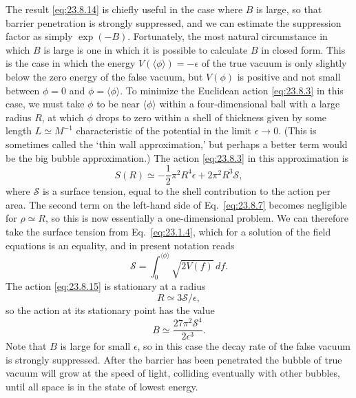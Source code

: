 The result \eqref{eq:23.8.14} is chiefly useful in the case where $B$ is large, so that barrier penetration is strongly suppressed, and we can estimate the suppression factor as simply $\exp(-B)$. Fortunately, the most natural circumstance in which $B$ is large is one in which it is possible to calculate $B$ in closed form. This is the case in which the energy $V(\langle\phi\rangle)=-\epsilon$ of the true vacuum is only slightly below the zero energy of the false vacuum, but $V(\phi)$ is positive and not small between $\phi=0$ and $\phi=\langle\phi\rangle$. To minimize the Euclidean action \eqref{eq:23.8.3} in this case, we must take $\phi$ to be near $\langle\phi\rangle$ within a four-dimensional ball with a large radius $R$, at which $\phi$ drops to zero within a shell of thickness given by some length $L\simeq M^{-1}$ characteristic of the potential in the limit $\epsilon\to0$. (This is sometimes called the `thin wall approximation,' but perhaps a better term would be the big bubble approximation.) The action \eqref{eq:23.8.3} in this approximation is
\begin{equation}
 S(R)\simeq-\frac{1}{2}\pi^2R^4\epsilon+2\pi^2R^3\mathcal S,
 \tag{23.8.15}\label{eq:23.8.15}
\end{equation}
where $\mathcal S$ is a surface tension, equal to the shell contribution to the action per area. The second term on the left-hand side of Eq.~\eqref{eq:23.8.7} becomes negligible for $\rho\simeq R$, so this is now essentially a one-dimensional problem. We can therefore take the surface tension from Eq.~\eqref{eq:23.1.4}, which for a solution of the field equations is an equality, and in present notation reads
\begin{equation}
 \mathcal S=\int_0^{\langle\phi\rangle}\sqrt{2V(f)}\,df.
 \tag{23.8.16}\label{eq:23.8.16}
\end{equation}
The action \eqref{eq:23.8.15} is stationary at a radius
\begin{equation}
 R\simeq3\mathcal S/\epsilon,
 \tag{23.8.17}\label{eq:23.8.17}
\end{equation}
so the action at its stationary point has the value
\begin{equation}
 B\simeq\frac{27\pi^2\mathcal S^4}{2\epsilon^3}.
 \tag{23.8.18}\label{eq:23.8.18}
\end{equation}
Note that $B$ is large for small $\epsilon$, so in this case the decay rate of the false vacuum is strongly suppressed. After the barrier has been penetrated the bubble of true vacuum will grow at the speed of light, colliding eventually with other bubbles, until all space is in the state of lowest energy.
